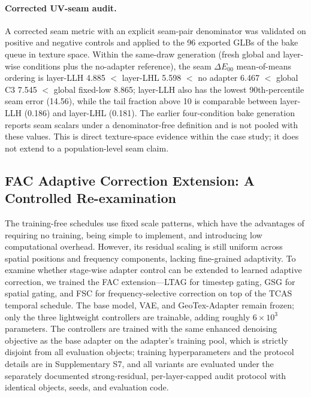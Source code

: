 \documentclass[times,twocolumn,final]{elsarticle}
\begin{document}
\paragraph{Corrected UV-seam audit.}
A corrected seam metric with an explicit seam-pair denominator was validated
on positive and negative controls and applied to the 96 exported GLBs of the
bake queue in texture space. Within the same-draw generation (fresh global
and layer-wise conditions plus the no-adapter reference), the seam
$\Delta E_{00}$ mean-of-means ordering is layer-LLH 4.885 $<$ layer-LHL
5.598 $<$ no adapter 6.467 $<$ global C3 7.545 $<$ global fixed-low 8.865;
layer-LLH also has the lowest 90th-percentile seam error (14.56), while the
tail fraction above 10 is comparable between layer-LLH (0.186) and layer-LHL
(0.181). The earlier four-condition bake generation reports seam scalars
under a denominator-free definition and is not pooled with these values.
This is direct texture-space evidence within the case study; it does not
extend to a population-level seam claim.

\subsection{FAC Adaptive Correction Extension: A Controlled Re-examination}
\label{subsec:facexp}

The training-free schedules use fixed scale patterns, which have the advantages of requiring no training, being simple to implement, and introducing low computational overhead. However, its residual scaling is still uniform across spatial positions and frequency components, lacking fine-grained adaptivity. To examine whether stage-wise adapter control can be extended to learned adaptive correction, we trained the FAC extension---LTAG for timestep gating, GSG for spatial gating, and FSC for frequency-selective correction on top of the TCAS temporal schedule. The base model, VAE, and GeoTex-Adapter remain frozen; only the three lightweight controllers are trainable, adding roughly $6\times10^{3}$ parameters. The controllers are trained with the same enhanced denoising objective as the base adapter on the adapter's training pool, which is strictly disjoint from all evaluation objects; training hyperparameters and the protocol details are in Supplementary S7, and all variants are evaluated under the separately documented strong-residual, per-layer-capped audit protocol with identical objects, seeds, and evaluation code.
\end{document}

